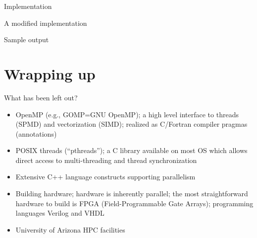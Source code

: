 \documentclass[pdflatex,colorlinks,landscape]{beamer}
\renewcommand\emph[1]{{\color{magenta}#1}}
\begin{document}
\begin{frame}[allowframebreaks]{Implementation}
  \begin{small}
    
  \end{small}
\end{frame}

\begin{frame}[allowframebreaks]{A modified implementation}
  \begin{small}
    
  \end{small}
\end{frame}

\begin{frame}[allowframebreaks]{Sample output}
  \begin{tiny}
  \end{tiny}
\end{frame}

\section{Wrapping up}

\begin{frame}{What has been left out?}
  \begin{itemize}
  \item \emph{OpenMP} (e.g., GOMP=GNU OpenMP); a high
    level interface to threads (SPMD) and
    vectorization (SIMD); realized as C/Fortran compiler
    \emph{pragmas} (annotations)
  \item \emph{POSIX threads} (``pthreads''); a C library available on most OS
    which allows direct access to multi-threading and
    thread synchronization
  \item Extensive \emph{C++ language} constructs supporting parallelism
  \item \emph{Building hardware}; hardware is inherently parallel;
    the most straightforward hardware to build is FPGA (Field-Programmable Gate Arrays);
    programming languages Verilog and VHDL
  \item University of Arizona \emph{HPC facilities}
  \end{itemize}
\end{frame}
\end{document}
